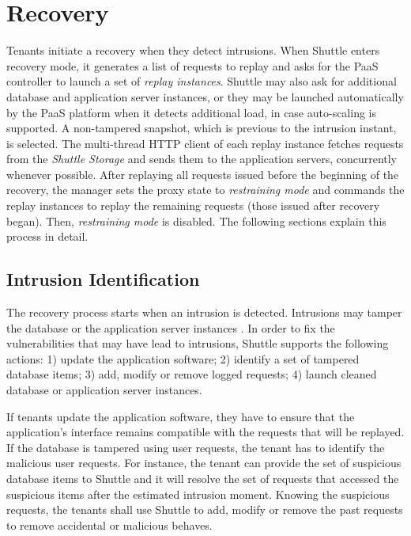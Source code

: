 \section{Recovery}
\label{sec:recovery}
Tenants initiate a recovery when they detect intrusions. When Shuttle enters recovery mode, it generates a list of requests to replay and asks for the \ac{PaaS} controller to launch a set of \textit{replay instances}. Shuttle may also ask for additional database and application server instances, or they may be launched automatically by the \ac{PaaS} platform when it detects additional load, in case auto-scaling is supported. A non-tampered snapshot, which is previous to the intrusion instant, is selected. The multi-thread HTTP client of each replay instance fetches requests from the \emph{Shuttle Storage} and sends them to the application servers, concurrently whenever possible. After replaying all requests issued before the beginning of the recovery, the manager sets the proxy state to \emph{restraining mode} and commands the replay instances to replay the remaining requests (those issued after recovery began). Then, \emph{restraining mode} is disabled. 
The following sections explain this process in detail.

\subsection{Intrusion Identification}
\label{sec:recovery:detection}
The recovery process starts when an intrusion is detected.  Intrusions may tamper the database  or the application server instances . In order to fix the vulnerabilities that may have lead to intrusions, Shuttle supports the following actions: 1) update the application software; 2) identify a set of tampered database items; 3) add, modify or remove logged requests; 4) launch cleaned database or application server instances.

If tenants update the application software, they have to ensure that the application's interface remains compatible with the requests that will be replayed. If the database is tampered using user requests, the tenant has to identify the malicious user requests. For instance, the tenant can provide the set of suspicious database items to Shuttle and it will resolve the set of requests that accessed the suspicious items after the estimated intrusion moment. Knowing the suspicious requests, the tenants shall use Shuttle to add, modify or remove the past requests to remove accidental or malicious behaves. 

